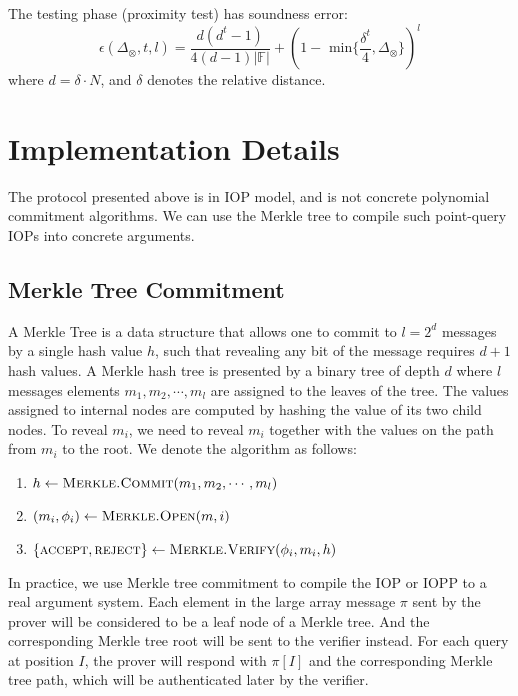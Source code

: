 \begin{lemma}
\label{lemma:pc-soundness}
The testing phase (proximity test) has soundness error:
$$
    \epsilon(\Delta_\otimes, t, l) = \frac{d(d^t-1)}{4(d-1)|\mathbb{F}|} + (1 - \text{ min}\{\frac{\delta^t}{4}, \Delta_\otimes \})^l
$$
where $d = \delta \cdot N$, and $\delta$ denotes the relative distance.
\end{lemma}


\section{Implementation Details}

The protocol presented above is in IOP model, and is not concrete polynomial commitment algorithms. We can use the Merkle tree to compile such point-query IOPs into concrete arguments.

\subsection{Merkle Tree Commitment}

A Merkle Tree is a data structure that allows one to commit to $l = 2^{d}$ messages by a single hash value $h$, such that revealing any bit of the message requires $d+1$ hash values. A Merkle hash tree is presented by a binary tree of depth $d$ where $l$ messages elements $m_1, m_2, \cdots, m_l$ are assigned to the leaves of the tree. The values assigned to internal nodes are computed by hashing the value of its two child nodes. To reveal $m_i$, we need to reveal $m_i$ together with the values on the path from $m_i$ to the root. We denote the algorithm as follows:

\begin{enumerate}
    \item $h \leftarrow \textsc{Merkle.Commit}(m_1, m_2, \cdots, m_l)$
    \item $(m_i, \phi_i) \leftarrow \textsc{Merkle.Open}(m, i)$
    \item $\{\textsc{accept}, \textsc{reject}\} \leftarrow \textsc{Merkle.Verify}(\phi_i, m_i, h)$
\end{enumerate}

In practice, we use Merkle tree commitment to compile the IOP or IOPP to a real argument system. Each element in the large array message $\pi$ sent by the prover will be considered to be a leaf node of a Merkle tree. And the corresponding Merkle tree root will be sent to the verifier instead. For each query at position $I$, the prover will respond with $\pi[I]$ and the corresponding Merkle tree path, which will be authenticated later by the verifier.

